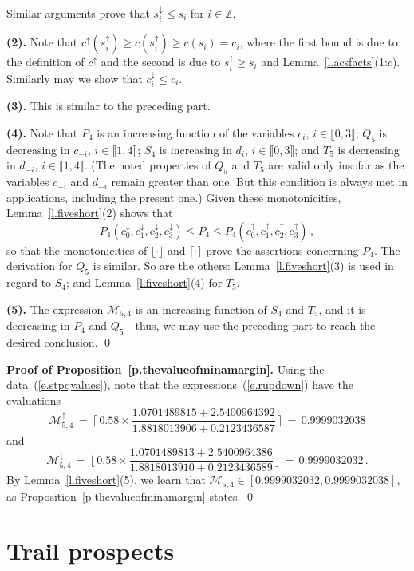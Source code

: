 \documentclass[letterpaper,11pt,oneside,reqno]{amsbook}
\newcommand{\Z}{\ensuremath{\mathbb{Z}}}
\numberwithin{figure}{chapter}
\theoremstyle{definition}
\theoremstyle{definition}
\theoremstyle{definition}
\theoremstyle{definition}
\theoremstyle{definition}
\newcommand{\intint}[1]{\llbracket 1,#1 \rrbracket}
\newcommand{\minamm}{\mathcal{M}}
\begin{document}
Similar arguments prove that $s_i^\downarrow \leq s_i$ for $i \in \Z$.

{\bf (2).} Note that $c^\uparrow(s_i^\uparrow) \geq c(s_i^\uparrow) \geq c(s_i) = c_i$, where the first bound is due to the definition of $c^\uparrow$ and the second is due to $s_i^\uparrow \geq s_i$ and Lemma~\ref{l.acsfacts}(1:$c$). Similarly may we show that $c_i^\downarrow \leq c_i$.

{\bf (3).} This is similar to the preceding part.

{\bf (4).} Note that $P_4$ is an increasing function of the variables $c_i$, $i \in \llbracket 0,3 \rrbracket$; 
$Q_5$ is decreasing in $c_{-i}$, $i \in \intint{4}$; $S_4$ is increasing in  $d_i$, $i \in \llbracket 0,3 \rrbracket$; and $T_5$ is decreasing in $d_{-i}$, $i \in \intint{4}$.
(The noted properties of $Q_5$ and $T_5$ are valid only insofar as the variables $c_{-i}$ and $d_{-i}$ remain greater than one. But this condition is always met in applications, including the present one.)
Given these monotonicities, Lemma~\ref{l.fiveshort}(2) shows that
$$
 P_4(c^\downarrow_0,c^\downarrow_1,c^\downarrow_2,c^\downarrow_3) \leq  P_4  \leq  P_4(c^\uparrow_0,c^\uparrow_1,c^\uparrow_2,c^\uparrow_3) \, ,
$$
so that the monotonicities of $\lfloor \cdot \rfloor$ and $\lceil \cdot \rceil$ prove the assertions concerning $P_4$.
The derivation for $Q_5$ is similar. So are the others: Lemma~\ref{l.fiveshort}(3) is used in regard to $S_4$; and Lemma~\ref{l.fiveshort}(4) for $T_5$.

{\bf (5).} The expression $\minamm_{5,4}$ is an increasing function of $S_4$ and $T_5$, and it is decreasing in $P_4$ and $Q_5$---thus, we may use the preceding part to reach the desired conclusion. \qed

{\bf Proof of Proposition~\ref{p.thevalueofminamargin}.}
Using the data~(\ref{e.stpqvalues}), note that the expressions~(\ref{e.rupdown}) have the evaluations
$$
 \minamm^\uparrow_{5,4} \, = \,  \biggl\lceil \, 0.58 \times \frac{1.0701489815 + 2.5400964392}{1.8818013906 + 0.2123436587} \,  \biggr\rceil \, = \, 0.9999032038 
 $$
 and
 $$
   \minamm^\downarrow_{5,4} \, = \, \biggl\lfloor \, 0.58 \times \frac{1.0701489813 + 2.5400964386}{1.8818013910 + 0.2123436589} \,  \biggr\rfloor \, = \, 0.9999032032 \, .
   $$
By Lemma~\ref{l.fiveshort}(5), we learn that
$\minamm_{5,4} \in [0.9999032032 , 0.9999032038]$, as Proposition~\ref{p.thevalueofminamargin} states. \qed

\chapter{Trail prospects}\label{c.prospects}
\end{document}
